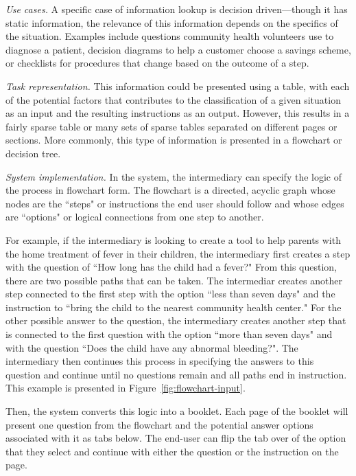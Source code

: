 \documentclass{sig-alternate}
\begin{document}
\emph{Use cases.}
A specific case of information lookup is decision driven---though it has static information, the relevance of this information depends on the specifics of the situation. Examples include questions community health volunteers use to diagnose a patient, decision diagrams to help a customer choose a savings scheme, or checklists for procedures that change based on the outcome of a step.

\emph{Task representation.}
This information could be presented using a table, with each of the potential factors that contributes to the classification of a given situation as an input and the resulting instructions as an output. However, this results in a fairly sparse table or many sets of sparse tables separated on different pages or sections. More commonly, this type of information is presented in a flowchart or decision tree. 

\emph{System implementation.}
In the \nifty system, the intermediary can specify the logic of the process in flowchart form. The flowchart is a directed, acyclic graph whose nodes are the ``steps" or instructions the end user should follow and whose edges are  ``options" or logical connections from one step to another.

For example, if the intermediary is looking to create a tool to help parents with the home treatment of fever in their children, the intermediary first creates a step with the question of ``How long has the child had a fever?" From this question, there are two possible paths that can be taken. The intermediar creates another step connected to the first step with the option ``less than seven days" and the instruction to ``bring the child to the nearest community health center." For the other possible answer to the question, the intermediary creates another step that is connected to the first question with the option ``more than seven days" and with the question ``Does the child have any abnormal bleeding?". The intermediary then continues this process in specifying the answers to this question and continue until no questions remain and all paths end in instruction. This example is presented in Figure~\ref{fig:flowchart-input}.

Then, the system converts this logic into a booklet. Each page of the booklet will present one question from the flowchart and the potential answer options associated with it as tabs below. The end-user can flip the tab over of the option that they select and continue with either the question or the instruction on the page.
\end{document}
